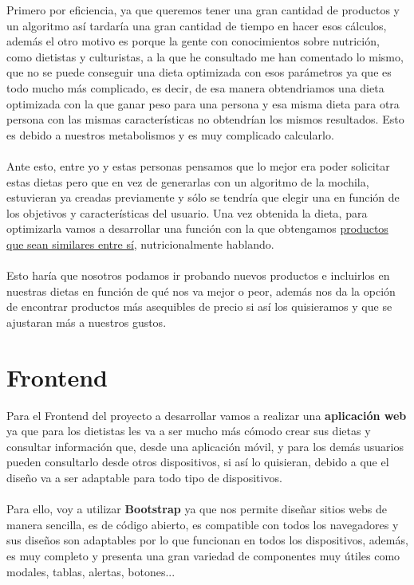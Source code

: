 Primero por eficiencia, ya que queremos tener una gran cantidad de productos y un algoritmo así tardaría una gran cantidad de tiempo en hacer esos cálculos, además el otro motivo es 
porque la gente con conocimientos sobre nutrición, como dietistas y culturistas, a la que he consultado me han comentado lo mismo, que no se puede conseguir una dieta optimizada con esos 
parámetros ya que es todo mucho más complicado, es decir, de esa manera obtendriamos una dieta optimizada con la que ganar peso para una persona y esa misma dieta para otra persona con 
las mismas características no obtendrían los mismos resultados. Esto es debido a nuestros metabolismos y es muy complicado calcularlo.\\\\

Ante esto, entre yo y estas personas pensamos que lo mejor era poder solicitar estas dietas pero que en vez de generarlas con un algoritmo de la mochila, estuvieran ya creadas previamente
y sólo se tendría que elegir una en función de los objetivos y características del usuario. Una vez obtenida la dieta, para optimizarla vamos a desarrollar una función con la que 
obtengamos \href{https://github.com/josemip98/TFG/issues/10}{productos que sean similares entre sí}, nutricionalmente hablando.\\\\

Esto haría que nosotros podamos ir probando nuevos productos e incluirlos en nuestras dietas en función de qué nos va mejor o peor, además nos da la opción de encontrar productos más asequibles de precio si así los quisieramos y que se ajustaran más a nuestros gustos.

\section{Frontend} \label{sec:frontend}

Para el Frontend del proyecto a desarrollar vamos a realizar una \textbf{aplicación web} ya que para los dietistas les va a ser mucho más cómodo
crear sus dietas y consultar información que, desde una aplicación móvil, y para los demás usuarios pueden consultarlo desde otros dispositivos, si así lo quisieran, 
debido a que el diseño va a ser adaptable para todo tipo de dispositivos.\\ \\

Para ello, voy a utilizar \textbf{Bootstrap} \cite{bootstrap} ya que nos permite diseñar sitios webs de manera sencilla,
es de código abierto, es compatible con todos los navegadores y sus diseños son adaptables por lo que funcionan en todos los dispositivos,
además, es muy completo y presenta una gran variedad de componentes muy útiles como modales, tablas, alertas, botones...\\ \\

